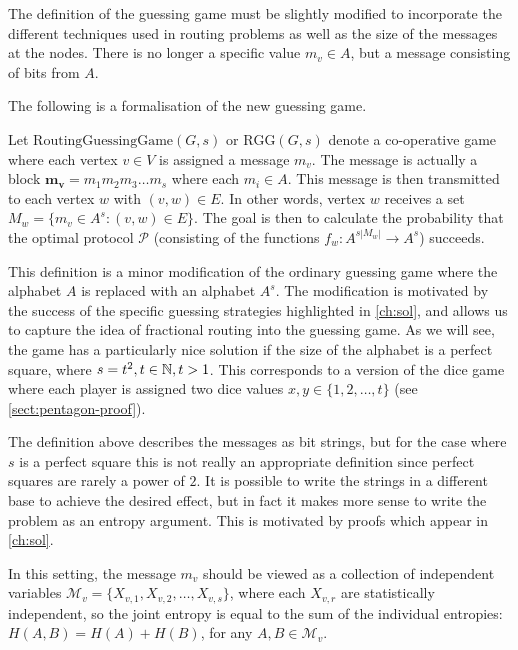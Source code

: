 The definition of the guessing game must be slightly modified to incorporate the different techniques used in routing problems as well as the size of the messages at the nodes. There is no longer a specific value $m_v \in A$, but a message consisting of bits from $A$.

The following is a formalisation of the new guessing game.

\begin{definition}

Let $\mathrm{RoutingGuessingGame}(G, s)$ or $\mathrm{RGG}(G, s)$ denote a co-operative game where each vertex $v \in V$ is assigned a message $m_v$. The message is actually a block $\mathbf{m_v} = m_1 m_2 m_3 \dots m_s$ where each $m_i \in A$. This message is then transmitted to each vertex $w$ with $(v, w) \in E$. In other words, vertex $w$ receives a set $M_w = \{m_v \in A^s : (v, w) \in E\}$. The goal is then to calculate the probability that the optimal protocol $\mathcal{P}$ (consisting of the functions $f_w : A^{s|M_w|} \rightarrow A^s$) succeeds.

\end{definition}

This definition is a minor modification of the ordinary guessing game where the alphabet $A$ is replaced with an alphabet $A^s$. The modification is motivated by the success of the specific guessing strategies highlighted in \autoref{ch:sol}, and allows us to capture the idea of fractional routing into the guessing game. As we will see, the game has a particularly nice solution if the size of the alphabet is a perfect square, where $s = t^2, t \in \mathbb{N}, t > 1$. This corresponds to a version of the dice game where each player is assigned two dice values $x, y \in \{1, 2, \dots, t\}$ (see \autoref{sect:pentagon-proof}).

The definition above describes the messages as bit strings, but for the case where $s$ is a perfect square this is not really an appropriate definition since perfect squares are rarely a power of $2$. It is possible to write the strings in a different base to achieve the desired effect, but in fact it makes more sense to write the problem as an entropy argument. This is motivated by proofs which appear in \autoref{ch:sol}.

In this setting, the message $m_v$ should be viewed as a collection of independent variables $\mathcal{M}_v = \{ X_{v, 1}, X_{v, 2}, \dots, X_{v, s} \}$, where each $X_{v, r}$ are statistically independent, so the joint entropy is equal to the sum of the individual entropies: $H(A, B) = H(A) + H(B)$, for any $A, B \in \mathcal{M}_v$.

